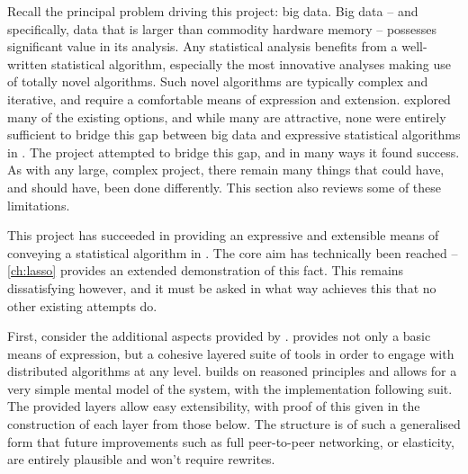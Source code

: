 Recall the principal problem driving this project: big data.
Big data -- and specifically, data that is larger than commodity hardware memory -- possesses significant value in its analysis.
Any statistical analysis benefits from a well-written statistical algorithm, especially the most innovative analyses making use of totally novel algorithms.
Such novel algorithms are typically complex and iterative, and require a comfortable means of expression and extension.
 explored many of the existing options, and while many are attractive, none were entirely sufficient to bridge this gap between big data and expressive statistical algorithms in \R{}.
The \lsr{} project attempted to bridge this gap, and in many ways it found success.
As with any large, complex project, there remain many things that could have, and should have, been done differently.
This section also reviews some of these limitations.

This project has succeeded in providing an expressive and extensible means of conveying a statistical algorithm in \R{}.
The core aim has technically been reached -- \cref{ch:lasso} provides an extended demonstration of this fact.
This remains dissatisfying however, and it must be asked in what way \lsr{} achieves this that no other existing attempts do.

First, consider the additional aspects provided by \lsr{}.
\lsr{} provides not only a basic means of expression, but a cohesive layered suite of tools in order to engage with distributed algorithms at any level.
\lsr{} builds on reasoned principles and allows for a very simple mental model of the system, with the implementation following suit.
The provided layers allow easy extensibility, with proof of this given in the construction of each layer from those below.
The structure is of such a generalised form that future improvements such as full peer-to-peer networking, or elasticity, are entirely plausible and won't require rewrites.

